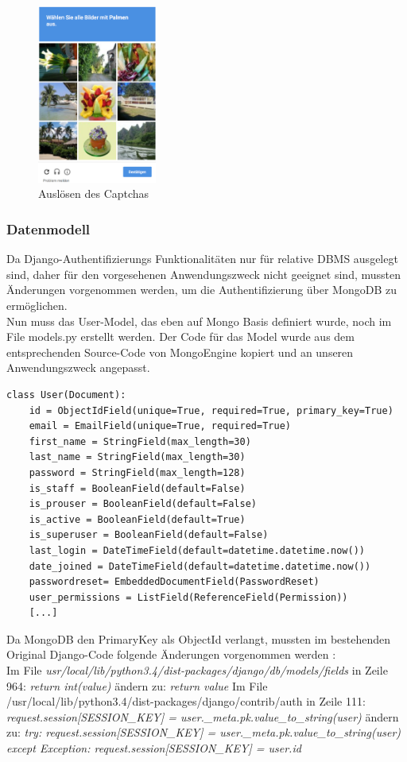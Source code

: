 \begin{figure}[ht]
\includegraphics[width=0.35\textwidth]{images/usermanagement/Captcha}
	\caption{Auslösen des Captchas}
	\label{fig2}
\end{figure}

\subsubsection{Datenmodell}
Da Django-Authentifizierungs Funktionalitäten nur für relative DBMS ausgelegt sind, daher für den vorgesehenen Anwendungszweck nicht geeignet sind, mussten Änderungen vorgenommen werden, um die Authentifizierung über MongoDB zu ermöglichen.\\
Nun muss das User-Model, das eben auf Mongo Basis definiert wurde, noch im File models.py erstellt werden. Der Code für das Model wurde aus dem entsprechenden Source-Code von MongoEngine \cite{MONGOENGINE} kopiert und an unseren Anwendungszweck angepasst.
\begin{lstlisting}
class User(Document):
    id = ObjectIdField(unique=True, required=True, primary_key=True)
    email = EmailField(unique=True, required=True)
    first_name = StringField(max_length=30)
    last_name = StringField(max_length=30)
    password = StringField(max_length=128)
    is_staff = BooleanField(default=False)
    is_prouser = BooleanField(default=False)
    is_active = BooleanField(default=True)
    is_superuser = BooleanField(default=False)
    last_login = DateTimeField(default=datetime.datetime.now())
    date_joined = DateTimeField(default=datetime.datetime.now())
    passwordreset= EmbeddedDocumentField(PasswordReset)
    user_permissions = ListField(ReferenceField(Permission))
    [...]
\end{lstlisting}

Da MongoDB den PrimaryKey als ObjectId verlangt, mussten im bestehenden Original Django-Code folgende Änderungen vorgenommen werden \cite{ISSUE}:\\
Im File \textit{usr/local/lib/python3.4/dist-packages/django/db/models/fields} in Zeile 964: 
\textit{return int(value)}
ändern zu:
\textit{return value}
Im File /usr/local/lib/python3.4/dist-packages/django/contrib/auth in Zeile 111:
\textit{request.session[SESSION\_KEY] = user.\_meta.pk.value\_to\_string(user)}
ändern zu:
\textit{try:
 	request.session[SESSION\_KEY] = user.\_meta.pk.value\_to\_string(user)
except Exception:
 	request.session[SESSION\_KEY] = user.id}

